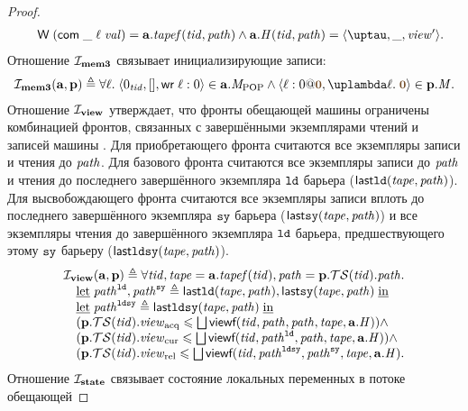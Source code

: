 \begin{proof}
\[\begin{array}{l}
  \quad  \tapeWrite{(\tapeWriteCommitted{\_}{\loc}{\stval})} = \aT.\tapef(\tId, \cpath) \land
      \aT.\hmap(\tId, \cpath) = \angled{\tau, \_, \R'}.
\end{array}\]
Отношение $\mathcal{I}_{\rm \bf mem3}$ связывает инициализирующие записи:
\[\begin{array}{l}
\invMemThree(\aT, \p) \triangleq
  \forall \loc. \; \stRequestWrite{0_{\tId}}{[]}{\loc}{0} \in \aT.\Mpop \land \writeEvt{\loc}{0}{\tstamp{0}}{\lambda \loc. \; \tstamp{0}} \in \p.\Mprom.
\end{array}\]
Отношение $\mathcal{I}_{\rm \bf view}$ утверждает, что фронты обещающей машины ограничены комбинацией
фронтов, связанных с завершёнными экземплярами чтений и записей машины \ARMt.
Для приобретающего фронта считаются все экземпляры записи и чтения до $\mathit{path}$.
Для базового фронта считаются все экземпляры записи до $\mathit{path}$ и чтения до
последнего завершённого экземпляра $\mathtt{ld}$ барьера ($\mathsf{last}\mathtt{ld}(\mathit{tape}, \mathit{path})$).
Для высвобождающего фронта считаются все экземпляры записи вплоть до последнего завершённого
экземпляра $\mathtt{sy}$ барьера ($\mathsf{last}\mathtt{sy}(\mathit{tape}, \mathit{path})$)
и все экземпляры чтения до завершённого экземпляра $\mathtt{ld}$ барьера,
предшествующего этому $\mathtt{sy}$ барьеру ($\mathsf{last}\mathtt{ld}\mathtt{sy}(\mathit{tape}, \mathit{path})$).
\[\begin{array}{l}
\mathcal{I}_{\rm \bf view}(\mathbf{a}, \mathbf{p}) \triangleq
  \forall \mathit{tid}, \mathit{tape} = \mathbf{a}.\mathit{tapef}(\mathit{tid}), \mathit{path} = \mathbf{p}.\mathcal{TS}(\mathit{tid}).\mathit{path}. \\
  \quad \text{\underline{let}} \; \mathit{path}^{\mathtt{ld}}, \mathit{path}^{\mathtt{sy}} \triangleq
    \mathsf{last}\mathtt{ld}(\mathit{tape}, \mathit{path}),\mathsf{last}\mathtt{sy}(\mathit{tape}, \mathit{path}) \; \text{\underline{in}} \\
  \quad \text{\underline{let}} \; \mathit{path}^{\mathtt{ld}\mathtt{sy}} \triangleq \mathsf{last}\mathtt{ld}\mathtt{sy}(\mathit{tape}, \mathit{path}) \; \text{\underline{in}} \\
  \quad (\mathbf{p}.\mathcal{TS}(\mathit{tid}).\mathit{view}_{\mathrm{acq}} \leqslant \bigsqcup \textbf{\sf viewf}(\mathit{tid}, \mathit{path}, \mathit{path}, \mathit{tape}, \mathbf{a}.\mathit{H})) \land \\
  \quad (\mathbf{p}.\mathcal{TS}(\mathit{tid}).\mathit{view}_{\mathrm{cur}} \leqslant \bigsqcup \textbf{\sf viewf}(\mathit{tid}, \mathit{path}^{\mathtt{ld}}, \mathit{path}, \mathit{tape}, \mathbf{a}.\mathit{H})) \land \\
  \quad (\mathbf{p}.\mathcal{TS}(\mathit{tid}).\mathit{view}_{\mathrm{rel}} \leqslant \bigsqcup \textbf{\sf viewf}(\mathit{tid}, \mathit{path}^{\mathtt{ld}\mathtt{sy}}, \mathit{path}^{\mathtt{sy}}, \mathit{tape}, \mathbf{a}.\mathit{H}).\\
\end{array}\]
Отношение $\mathcal{I}_{\rm \bf state}$ связывает состояние локальных переменных в потоке обещающей

\end{proof}
